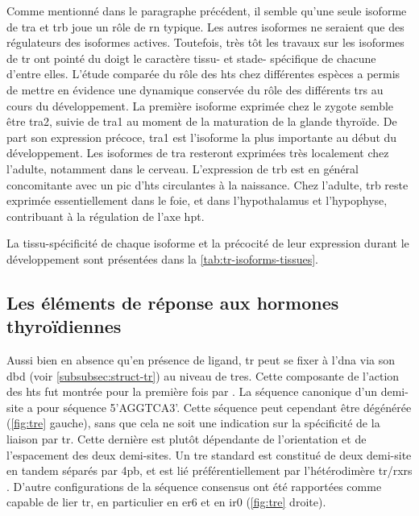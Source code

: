 Comme mentionné dans le paragraphe précédent, il semble qu'une seule isoforme de \gls{tra} et \gls{trb} joue un rôle de \gls{rn} typique.
Les autres isoformes ne seraient que des régulateurs des isoformes actives.
Toutefois, très tôt les travaux sur les isoformes de \gls{tr} ont pointé du doigt le caractère tissu- et stade- spécifique de chacune d'entre elles.
L'étude comparée du rôle des \glspl{ht} chez différentes espèces a permis de mettre en évidence une dynamique conservée du rôle des différents \glspl{tr} au cours du développement.
La première isoforme exprimée chez le zygote semble être \gls{tra}2, suivie de \gls{tra}1 au moment de la maturation de la glande thyroïde.
De part son expression précoce, \gls{tra}1 est l'isoforme la plus importante au début du développement.
Les isoformes de \gls{tra} resteront exprimées très localement chez l'adulte, notamment dans le cerveau. 
L'expression de \gls{trb} est en général concomitante avec un pic d'\glspl{ht} circulantes à la naissance.
Chez l'adulte, \gls{trb} reste exprimée essentiellement dans le foie, et dans l'hypothalamus et l'hypophyse, contribuant à la régulation de l'axe \gls{hpt}.

La tissu-spécificité de chaque isoforme et la précocité de leur expression durant le développement sont présentées dans la \autoref{tab:tr-isoforms-tissues}.




\subsection{Les éléments de réponse aux hormones thyroïdiennes}
Aussi bien en absence qu'en présence de ligand, \gls{tr} peut se fixer à l'\gls{dna} via son \gls{dbd} (voir \autoref{subsubsec:struct-tr}) au niveau de \glspl{tre}.
Cette composante de l'action des \glspl{ht} fut montrée pour la première fois par \citet{Wight1987}.
La séquence canonique d'un demi-site a pour séquence 5'AGGTCA3'.
Cette séquence peut cependant être dégénérée (\autoref{fig:tre} gauche), sans que cela ne soit une indication sur la spécificité de la liaison par \gls{tr}.
Cette dernière est plutôt dépendante de l'orientation et de l'espacement des deux demi-sites.
Un \gls{tre} standard est constitué de deux demi-site en tandem séparés par 4pb, et est lié préférentiellement par l'hétérodimère \gls{tr}/\glspl{rxr} \citep{Wahlstrom1992}.
D'autre configurations de la séquence consensus ont été rapportées comme capable de lier \gls{tr}, en particulier en \gls{er6} et en \gls{ir0} (\autoref{fig:tre} droite).

